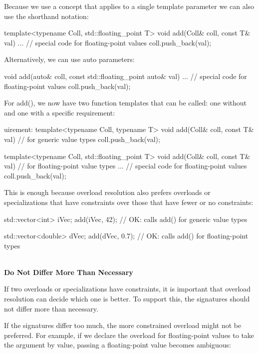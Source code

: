 Because we use a concept that applies to a single template parameter we can also use the shorthand notation:

\begin{cpp}
template<typename Coll, std::floating_point T>
void add(Coll& coll, const T& val)
{
	... // special code for floating-point values
	coll.push_back(val);
}
\end{cpp}

Alternatively, we can use auto parameters:

\begin{cpp}
void add(auto& coll, const std::floating_point auto& val)
{
	... // special code for floating-point values
	coll.push_back(val);
}
\end{cpp}

For add(), we now have two function templates that can be called: one without and one with a specific requirement:

\begin{cpp}
uirement:
template<typename Coll, typename T>
void add(Coll& coll, const T& val) // for generic value types
{
	coll.push_back(val);
}

template<typename Coll, std::floating_point T>
void add(Coll& coll, const T& val) // for floating-point value types
{
	... // special code for floating-point values
	coll.push_back(val);
}
\end{cpp}

This is enough because overload resolution also prefers overloads or specializations that have constraints over those that have fewer or no constraints:

\begin{cpp}
std::vector<int> iVec;
add(iVec, 42); // OK: calls add() for generic value types

std::vector<double> dVec;
add(dVec, 0.7); // OK: calls add() for floating-point types
\end{cpp}

\noindent
\hspace*{\fill} \\ %
\textbf{Do Not Differ More Than Necessary}

If two overloads or specializations have constraints, it is important that overload resolution can decide which one is better. To support this, the signatures should not differ more than necessary.

If the signatures differ too much, the more constrained overload might not be preferred. For example, if we declare the overload for floating-point values to take the argument by value, passing a floating-point value becomes ambiguous:

